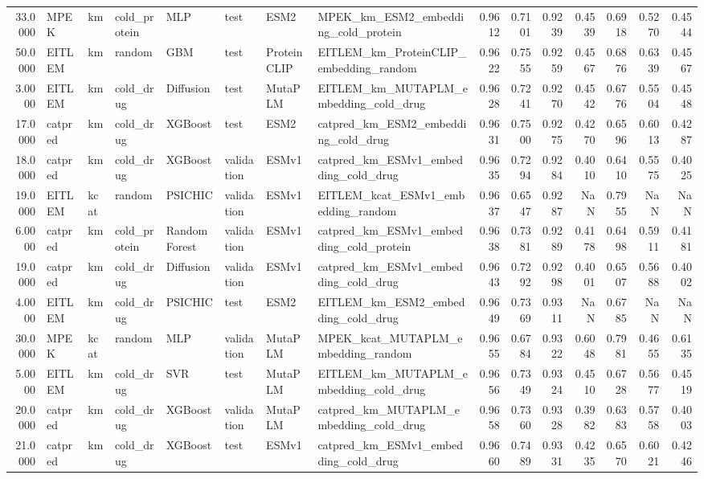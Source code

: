 \begin{tabular}{rlllllllrrrrrrr}
33.0000 & MPEK & km & cold_protein & MLP & test & ESM2 & MPEK_km_ESM2_embedding_cold_protein & 0.9612 & 0.7101 & 0.9239 & 0.4539 & 0.6918 & 0.5270 & 0.4544 \\
50.0000 & EITLEM & km & random & GBM & test & ProteinCLIP & EITLEM_km_ProteinCLIP_embedding_random & 0.9622 & 0.7555 & 0.9259 & 0.4567 & 0.6876 & 0.6339 & 0.4567 \\
3.0000 & EITLEM & km & cold_drug & Diffusion & test & MutaPLM & EITLEM_km_MUTAPLM_embedding_cold_drug & 0.9628 & 0.7241 & 0.9270 & 0.4542 & 0.6776 & 0.5504 & 0.4548 \\
17.0000 & catpred & km & cold_drug & XGBoost & test & ESM2 & catpred_km_ESM2_embedding_cold_drug & 0.9631 & 0.7500 & 0.9275 & 0.4270 & 0.6596 & 0.6013 & 0.4287 \\
18.0000 & catpred & km & cold_drug & XGBoost & validation & ESMv1 & catpred_km_ESMv1_embedding_cold_drug & 0.9635 & 0.7294 & 0.9284 & 0.4010 & 0.6410 & 0.5575 & 0.4025 \\
19.0000 & EITLEM & kcat & random & PSICHIC & validation & ESMv1 & EITLEM_kcat_ESMv1_embedding_random & 0.9637 & 0.6547 & 0.9287 & NaN & 0.7955 & NaN & NaN \\
6.0000 & catpred & km & cold_protein & Random Forest & validation & ESMv1 & catpred_km_ESMv1_embedding_cold_protein & 0.9638 & 0.7381 & 0.9289 & 0.4178 & 0.6498 & 0.5911 & 0.4181 \\
19.0000 & catpred & km & cold_drug & Diffusion & validation & ESMv1 & catpred_km_ESMv1_embedding_cold_drug & 0.9643 & 0.7292 & 0.9298 & 0.4001 & 0.6507 & 0.5688 & 0.4002 \\
4.0000 & EITLEM & km & cold_drug & PSICHIC & test & ESM2 & EITLEM_km_ESM2_embedding_cold_drug & 0.9649 & 0.7369 & 0.9311 & NaN & 0.6785 & NaN & NaN \\
30.0000 & MPEK & kcat & random & MLP & validation & MutaPLM & MPEK_kcat_MUTAPLM_embedding_random & 0.9655 & 0.6784 & 0.9322 & 0.6048 & 0.7981 & 0.4655 & 0.6135 \\
5.0000 & EITLEM & km & cold_drug & SVR & test & MutaPLM & EITLEM_km_MUTAPLM_embedding_cold_drug & 0.9656 & 0.7349 & 0.9324 & 0.4510 & 0.6728 & 0.5677 & 0.4519 \\
20.0000 & catpred & km & cold_drug & XGBoost & validation & MutaPLM & catpred_km_MUTAPLM_embedding_cold_drug & 0.9658 & 0.7360 & 0.9328 & 0.3982 & 0.6383 & 0.5758 & 0.4003 \\
21.0000 & catpred & km & cold_drug & XGBoost & test & ESMv1 & catpred_km_ESMv1_embedding_cold_drug & 0.9660 & 0.7489 & 0.9331 & 0.4235 & 0.6570 & 0.6021 & 0.4246 \\

\end{tabular}
